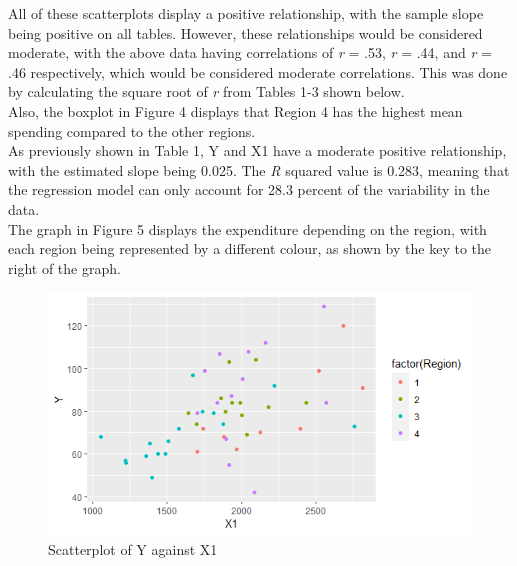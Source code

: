 \documentclass[12pt,letterpaper]{article}
\begin{document}
\noindent All of these scatterplots display a positive relationship, with the sample slope being positive on all tables. However, these relationships would be considered moderate, with the above data having correlations of \textit{r} = .53, \textit{r} = .44, and \textit{r} = .46 respectively, which would be considered moderate correlations. This was done by calculating the square root of \textit{r} from Tables 1-3 shown below. \\

\noindent Also, the boxplot in Figure 4 displays that Region 4 has the highest mean spending compared to the other regions. \\





\noindent As previously shown in Table 1, Y and X1 have a moderate positive relationship, with the estimated slope being 0.025. The \textit{R} squared value is 0.283, meaning that the regression model can only account for 28.3 percent of the variability in the data.\\

\noindent The graph in Figure 5 displays the expenditure depending on the region, with each region being represented by a different colour, as shown by the key to the right of the graph.

\begin{figure}[h!]\centering
	\caption{\footnotesize Scatterplot of Y against X1}
	\label{fig:plots1}
	\includegraphics[width=.75\textwidth]{Rplot03.png}
\end{figure}
\end{document}
